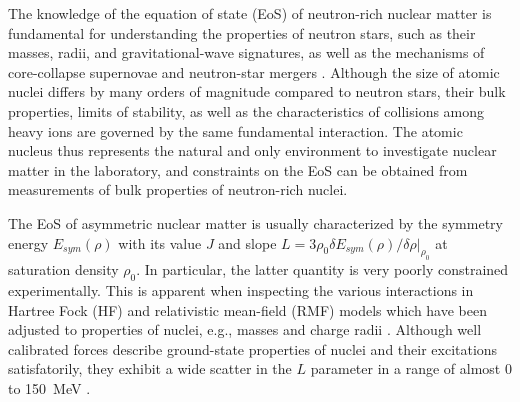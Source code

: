 \documentclass[english,aps,prl,twocolumn,superscriptaddress]{revtex4}
\begin{document}
\maketitle

The knowledge of the equation of state (EoS) of neutron-rich nuclear matter is fundamental for understanding the properties of neutron stars, such as their masses, radii, and gravitational-wave signatures, as well as the mechanisms of core-collapse supernovae and neutron-star mergers \cite{Gle97,Web05,Hae07,Lat12,LP04,BP12,Heb13}. Although the size of atomic nuclei differs by many orders of magnitude compared to neutron stars, their bulk properties, limits of stability, as well as the characteristics of collisions among heavy ions are governed by the same fundamental interaction. The atomic nucleus thus represents the natural and only environment to investigate nuclear matter in the laboratory, and constraints on the EoS can be obtained from measurements of bulk properties of neutron-rich nuclei.

The EoS of asymmetric nuclear matter is usually characterized by the symmetry energy $E_{sym}(\rho)$ with its value $J$ and slope $L=3\rho_0\delta E_{sym}(\rho)/\delta\rho |_{\rho_0}$ at saturation density $\rho_0$. In particular, the latter quantity is very poorly constrained experimentally. This is apparent when inspecting the various interactions in Hartree Fock (HF)  \cite{Dut12,Ben03,Sto07,Sel14} and relativistic mean-field (RMF) \cite{Bro00,TB01,Dut14,Ohn17}  models which have been adjusted to properties of nuclei, e.g., masses and charge radii \cite{Ber09}.  Although well calibrated forces describe ground-state properties of nuclei and their excitations satisfatorily, they exhibit a wide scatter in the $L$ parameter in a range of almost 0 to 150~MeV \cite{Roc11}. 
\end{document}
